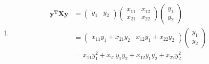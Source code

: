 \documentclass{harvardml}
\theoremstyle{definition}
\theoremstyle{plain}
\begin{document}
\begin{problem}
\begin{enumerate}[label=(\alph*)]
		        \item 
		        \begin{align*}
		        \mathbf{y^TXy} &= \begin{pmatrix}
		                        y_1 & y_2
		                        \end{pmatrix} \begin{pmatrix}
		                        x_{11} & x_{12} \\
		                        x_{21} & x_{22}
		                        \end{pmatrix} \begin{pmatrix}
		                        y_1 \\ y_2
		                        \end{pmatrix}  \\
		        &= \begin{pmatrix}
		                        x_{11}y_{1} + x_{21}y_{2} &
		                        x_{12}y_{1} + x_{22}y_{2}
		                        \end{pmatrix}\begin{pmatrix}
		                        y_1 \\ y_2
		                        \end{pmatrix} \\
		       &= x_{11}y_1^2 + x_{21}y_1y_2 + x_{12}y_1y_2 + x_{22}y_2^2\\
		        \end{align*}

		    \end{enumerate}
		\end{problem}
\end{document}
